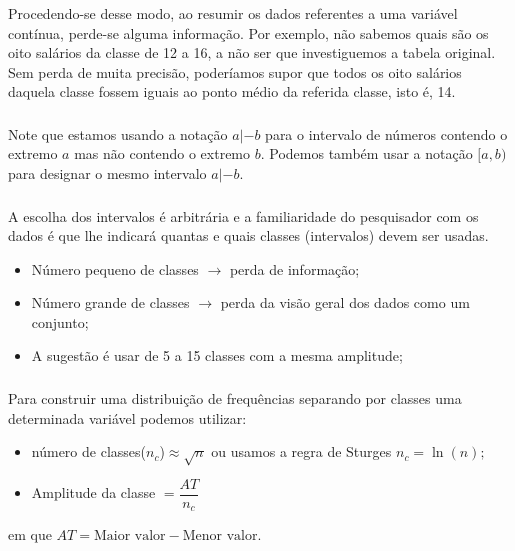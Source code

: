 \documentclass[14pt,aspectratio=1610]{beamer}
\begin{document}
\begin{frame}{}
\frametitle{}
\begin{block}{}
\justifying
Procedendo-se desse modo, ao resumir os dados referentes a uma variável contínua,
perde-se alguma informação. Por exemplo, não sabemos quais são os oito salários da
classe de 12 a 16, a não ser que investiguemos a tabela original. Sem perda de muita precisão, poderíamos supor que todos os oito salários daquela classe fossem iguais ao ponto médio da referida classe, isto é, 14.
\end{block}
\end{frame}

\begin{frame}{}
\frametitle{}
\begin{block}{}
\justifying
Note que estamos usando a notação $a|-b$ para o intervalo de números contendo o extremo $a$ mas não contendo o extremo $b.$ Podemos também usar a notação $[a, b)$ para designar o mesmo intervalo $a|-b$. 
\end{block}
\end{frame}

\begin{frame}{}
\frametitle{}
\begin{block}{}
\justifying
A escolha dos intervalos é arbitrária e a familiaridade do pesquisador com os dados é
que lhe indicará quantas e quais classes (intervalos) devem ser usadas.
\begin{itemize}
\item Número pequeno de classes $\rightarrow$ perda de informação;\pause
\item Número grande de classes $\rightarrow$ perda da visão geral dos dados
como um conjunto;\pause
\item A sugestão é usar de 5 a 15 classes com a mesma amplitude;
\end{itemize}
\end{block}
\end{frame}

\begin{frame}{}
\frametitle{}
\begin{block}{}
\justifying
Para construir uma distribuição de frequências separando por classes uma determinada variável podemos utilizar:
\begin{itemize}
\item número de classes($n_{c}$)$\approx \sqrt{n}$ ou usamos a regra de Sturges $n_{c}=\ln{(n)};$\pause
\item Amplitude da classe $=\dfrac{AT}{n_{c}}$ 
\end{itemize}
em que $AT=\textrm{Maior valor} - \textrm{Menor valor}.$
\end{block}
\end{frame}
\end{document}

